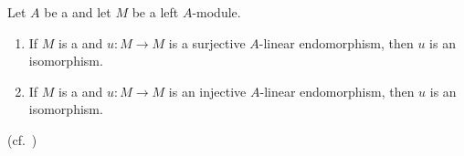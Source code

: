 \begin{proposition}  \label{proposition:surjective_endomorphism_of_a_noetherian_module_is_an_isomorphism}

	Let $A$ be a  and let $M$ be a left $A$-module.

	\begin{enumerate}
	    \item If $M$ is a  and $u \colon M \to M$ is a surjective $A$-linear endomorphism, then $u$ is an isomorphism.

	    \item If $M$ is a  and $u \colon M \to M$ is an injective $A$-linear endomorphism, then $u$ is an isomorphism.
	\end{enumerate}

	(cf.\ \cite[Chapter 6, Exercise 1]{atiyah_macdonald})
\end{proposition}
